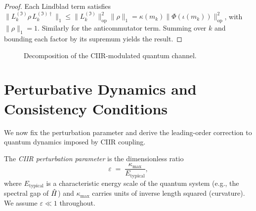 \begin{proof}
Each Lindblad term satisfies
$\|L_k^{(\mathfrak{I})}\rho\,L_k^{(\mathfrak{I})\dagger}\|_1
\leq \|L_k^{(\mathfrak{I})}\|_{\mathrm{op}}^2\|\rho\|_1
= \kappa(m_k)\|\Phi(\iota(m_k))\|_{\mathrm{op}}^2$,
with $\|\rho\|_1=1$.  Similarly for the anticommutator term.  Summing
over $k$ and bounding each factor by its supremum yields the result.
\end{proof}

\begin{figure}[t]
\centering
{}
\caption{Decomposition of the CIIR-modulated quantum channel.}
\label{fig:c10:channel}
\end{figure}

\section{Perturbative Dynamics and Consistency Conditions}
\label{sec:ch10:perturbative}

We now fix the perturbation parameter and derive the leading-order
correction to quantum dynamics imposed by CIIR coupling.

\begin{definition}
\label{def:10.10}
The \emph{CIIR perturbation parameter} is the dimensionless ratio
\begin{equation}
\label{eq:10.epsilon}
  \varepsilon
  \;=\;
  \frac{\kappa_{\max}}{E_{\mathrm{typical}}},
\end{equation}
where $E_{\mathrm{typical}}$ is a characteristic energy scale of the
quantum system (e.g., the spectral gap of $\hat{H}$) and $\kappa_{\max}$
carries units of inverse length squared (curvature).  We assume
$\varepsilon\ll 1$ throughout.
\end{definition}

